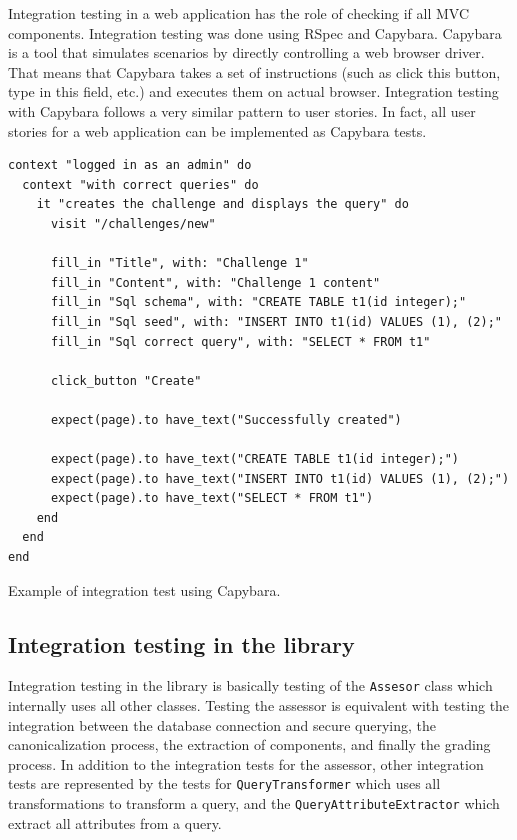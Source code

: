 Integration testing in a web application has the role of checking if all MVC components. Integration testing was done using RSpec and Capybara. Capybara is a tool that simulates scenarios by directly controlling a web browser driver. That means that Capybara takes a set of instructions (such as click this button, type in this field, etc.) and executes them on actual browser. Integration testing with Capybara follows a very similar pattern to user stories. In fact, all user stories for a web application can be implemented as Capybara tests.
\begin{listing}[H]
\begin{verbatim}
context "logged in as an admin" do
  context "with correct queries" do
    it "creates the challenge and displays the query" do
      visit "/challenges/new"

      fill_in "Title", with: "Challenge 1"
      fill_in "Content", with: "Challenge 1 content"
      fill_in "Sql schema", with: "CREATE TABLE t1(id integer);"
      fill_in "Sql seed", with: "INSERT INTO t1(id) VALUES (1), (2);"
      fill_in "Sql correct query", with: "SELECT * FROM t1"

      click_button "Create"

      expect(page).to have_text("Successfully created")

      expect(page).to have_text("CREATE TABLE t1(id integer);")
      expect(page).to have_text("INSERT INTO t1(id) VALUES (1), (2);")
      expect(page).to have_text("SELECT * FROM t1")
    end
  end
end
\end{verbatim}
\caption{Example of integration test using Capybara.}
\end{listing}

\subsection{Integration testing in the library}

Integration testing in the library is basically testing of the \texttt{Assesor} class which internally uses all other classes. Testing the assessor is equivalent with testing the integration between the database connection and secure querying, the canonicalization process, the extraction of components, and finally the grading process. In addition to the integration tests for the assessor, other integration tests are represented by the tests for \texttt{QueryTransformer} which uses all transformations to transform a query, and the \texttt{QueryAttributeExtractor} which extract all attributes from a query.

